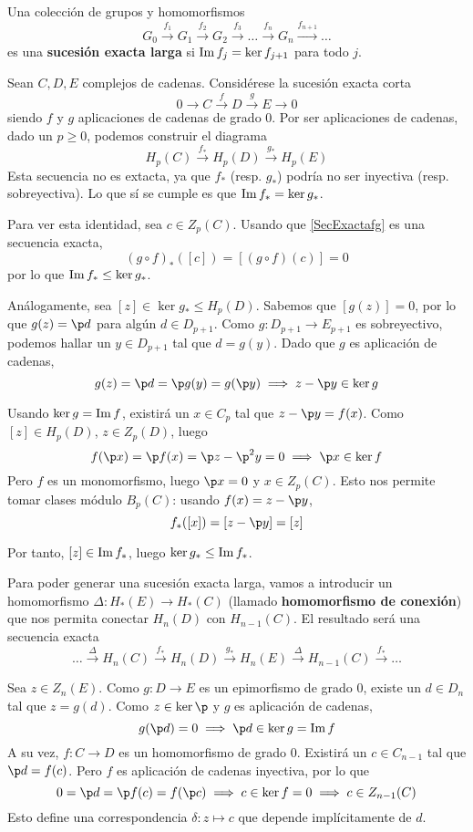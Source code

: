 \begin{definition}
Una colección de grupos y homomorfismos
\[G_0 \xrightarrow{ f_1 } G_1 \xrightarrow{ f_2 } G_2
\xrightarrow{ f_3 } \dots \xrightarrow{ f_n } G_n \xrightarrow{f_{n+1}} \dots\]
es una \textbf{sucesión exacta larga} si $\operatorname{Im} f_j=\ker f_{j+1}$ para todo $j$.
\end{definition}

Sean $C,D,E$ complejos de cadenas. Considérese la sucesión exacta corta
\begin{equation}
0 \to C \xrightarrow{ f } D \xrightarrow{ g } E \to 0 \label{SecExactafg}
\end{equation}
siendo $f$ y $g$ aplicaciones de cadenas de grado 0. Por ser aplicaciones de
cadenas, dado un $p \geq 0$, podemos construir el diagrama
\[H_p(C) \xrightarrow{ f_* } H_p(D) \xrightarrow{ g_* } H_p(E)\]
Esta secuencia no es extacta, ya que $f_*$ (resp. $g_*$) podría no ser inyectiva
(resp. sobreyectiva). Lo que sí se cumple es que $\operatorname{Im} f_*=\ker g_*$.

Para ver esta identidad, sea $c \in Z_p(C)$. Usando que \eqref{SecExactafg} es
una secuencia exacta,
\[(g\circ f)_*([c])=[(g\circ f)(c)]=0\]
por lo que $\operatorname{Im} f_* \leq \ker g_*$.

Análogamente, sea $[z] \in \ker g_* \leq H_p(D)$. Sabemos que $[g(z)]=0$, por
lo que $g(z)=\p d$ para algún $d \in D_{p+1}$. Como $g\colon D_{p+1} \to
E_{p+1}$ es sobreyectivo, podemos hallar un $y \in D_{p+1}$ tal que $d=g(y)$.
Dado que $g$ es aplicación de cadenas,
\[g(z)=\p d=\p g(y)=g(\p y) \implies z-\p y \in \ker g\]

Usando $\ker g=\operatorname{Im} f$, existirá un $x \in C_p$ tal que $z-\p y=f(x)$. Como
$[z] \in H_p(D)$, $z \in Z_p(D)$, luego
\[f(\p x)=\p f(x)=\p z-\p^2 y=0 \implies \p x \in \ker f\]
Pero $f$ es un monomorfismo, luego $\p x =0$ y $x \in Z_p(C)$. Esto nos permite
tomar clases módulo $B_p(C)$: usando $f(x)=z-\p y$,
\[f_*([x])=[z-\p y]=[z]\]

Por tanto, $[z] \in \operatorname{Im} f_*$, luego $\ker g_* \leq \operatorname{Im} f_*$.

Para poder generar una sucesión exacta larga, vamos a introducir un homomorfismo
$\Delta\colon H_*(E) \to H_*(C)$ (llamado \textbf{homomorfismo de conexión}) que
nos permita conectar $H_n(D)$ con $H_{n-1}(C)$. El resultado será una secuencia
exacta
\[\dots \xrightarrow{\Delta} H_n(C) \xrightarrow{ f_* } H_n(D) \xrightarrow{ g_* } H_n(E)
\xrightarrow{ \Delta } H_{n-1}(C)\xrightarrow{f_*}\dots\]

Sea $z \in Z_n(E)$. Como $g\colon D \to E$ es un epimorfismo de grado 0, existe
un $d \in D_n$ tal que $z=g(d)$. Como $z\in \ker \p$ y $g$ es aplicación de
cadenas,
\[g(\p d)=0 \implies \p d \in \ker g=\im f\]
A su vez, $f\colon C \to D$ es un homomorfismo de grado 0. Existirá un $c \in
C_{n-1}$ tal que $\p d=f(c)$. Pero $f$ es aplicación de cadenas inyectiva, por
lo que
\[0=\p d=\p f(c)=f(\p c) \implies c \in \ker f=0 \implies c \in Z_{n-1}(C)\]
Esto define una correspondencia $\delta\colon z \mapsto c$ que depende
implícitamente de $d$.


